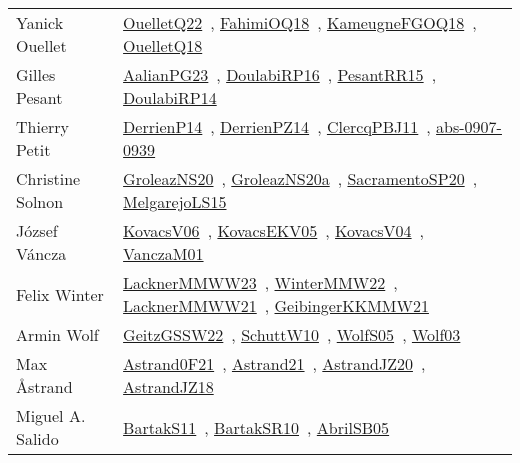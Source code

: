 {\begin{longtable}{p{4cm}p{20cm}}
Yanick Ouellet & \href{papers/OuelletQ22.pdf}{OuelletQ22}~\cite{OuelletQ22}, \href{articles/FahimiOQ18.pdf}{FahimiOQ18}~\cite{FahimiOQ18}, \href{papers/KameugneFGOQ18.pdf}{KameugneFGOQ18}~\cite{KameugneFGOQ18}, \href{papers/OuelletQ18.pdf}{OuelletQ18}~\cite{OuelletQ18}\\
Gilles Pesant & \href{papers/AalianPG23.pdf}{AalianPG23}~\cite{AalianPG23}, \href{}{DoulabiRP16}~\cite{DoulabiRP16}, \href{papers/PesantRR15.pdf}{PesantRR15}~\cite{PesantRR15}, \href{papers/DoulabiRP14.pdf}{DoulabiRP14}~\cite{DoulabiRP14}\\
Thierry Petit & \href{papers/DerrienP14.pdf}{DerrienP14}~\cite{DerrienP14}, \href{papers/DerrienPZ14.pdf}{DerrienPZ14}~\cite{DerrienPZ14}, \href{papers/ClercqPBJ11.pdf}{ClercqPBJ11}~\cite{ClercqPBJ11}, \href{articles/abs-0907-0939.pdf}{abs-0907-0939}~\cite{abs-0907-0939}\\
Christine Solnon & \href{papers/GroleazNS20.pdf}{GroleazNS20}~\cite{GroleazNS20}, \href{papers/GroleazNS20a.pdf}{GroleazNS20a}~\cite{GroleazNS20a}, \href{articles/SacramentoSP20.pdf}{SacramentoSP20}~\cite{SacramentoSP20}, \href{papers/MelgarejoLS15.pdf}{MelgarejoLS15}~\cite{MelgarejoLS15}\\
J{\'{o}}zsef V{\'{a}}ncza & \href{papers/KovacsV06.pdf}{KovacsV06}~\cite{KovacsV06}, \href{papers/KovacsEKV05.pdf}{KovacsEKV05}~\cite{KovacsEKV05}, \href{papers/KovacsV04.pdf}{KovacsV04}~\cite{KovacsV04}, \href{papers/VanczaM01.pdf}{VanczaM01}~\cite{VanczaM01}\\
Felix Winter & \href{articles/LacknerMMWW23.pdf}{LacknerMMWW23}~\cite{LacknerMMWW23}, \href{papers/WinterMMW22.pdf}{WinterMMW22}~\cite{WinterMMW22}, \href{papers/LacknerMMWW21.pdf}{LacknerMMWW21}~\cite{LacknerMMWW21}, \href{papers/GeibingerKKMMW21.pdf}{GeibingerKKMMW21}~\cite{GeibingerKKMMW21}\\
Armin Wolf & \href{papers/GeitzGSSW22.pdf}{GeitzGSSW22}~\cite{GeitzGSSW22}, \href{papers/SchuttW10.pdf}{SchuttW10}~\cite{SchuttW10}, \href{papers/WolfS05.pdf}{WolfS05}~\cite{WolfS05}, \href{papers/Wolf03.pdf}{Wolf03}~\cite{Wolf03}\\
Max {\AA}strand & \href{papers/Astrand0F21.pdf}{Astrand0F21}~\cite{Astrand0F21}, \href{}{Astrand21}~\cite{Astrand21}, \href{articles/AstrandJZ20.pdf}{AstrandJZ20}~\cite{AstrandJZ20}, \href{papers/AstrandJZ18.pdf}{AstrandJZ18}~\cite{AstrandJZ18}\\
Miguel A. Salido & \href{articles/BartakS11.pdf}{BartakS11}~\cite{BartakS11}, \href{articles/BartakSR10.pdf}{BartakSR10}~\cite{BartakSR10}, \href{papers/AbrilSB05.pdf}{AbrilSB05}~\cite{AbrilSB05}\\

\end{longtable}}
